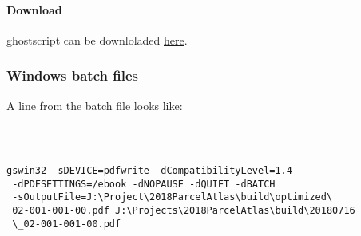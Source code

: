 \documentclass[class=article , crop=false, titlepage, twoside, multi={itemize, figure, verbatim}, float=false]{standalone}
\begin{document}
\paragraph{Download}
ghostscript can be downloladed \href{https://www.ghostscript.com/download/gsdnld.html}{here}.


\subsubsection{Windows batch files}
A line from the batch file looks like:\\
\begin{verbatim}



gswin32 -sDEVICE=pdfwrite -dCompatibilityLevel=1.4
 -dPDFSETTINGS=/ebook -dNOPAUSE -dQUIET -dBATCH
 -sOutputFile=J:\Project\2018ParcelAtlas\build\optimized\
 02-001-001-00.pdf J:\Projects\2018ParcelAtlas\build\20180716
 \_02-001-001-00.pdf

\end{verbatim}
\end{document}
